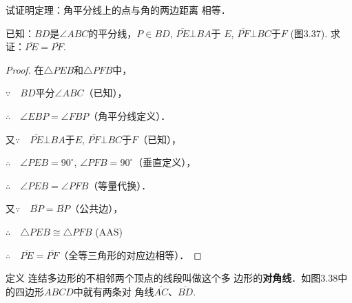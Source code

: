 \begin{example}
    试证明定理：角平分线上的点与角的两边距离
相等．

已知：$BD$是$\angle ABC$的平分线，$P\in BD$, $\overline{PE}\bot BA$于
$E$, $\overline{PF}\bot BC$于$F$ (图3.37). 
求证：$\overline{PE}=\overline{PF}$.
\end{example}

\begin{figure}[htp]
    \centering
{}
    \caption{}
\end{figure}

\begin{proof}
在$\triangle PEB$和$\triangle PFB$中，

$\because\quad BD$平分$\angle ABC$（已知），

$\therefore\quad \angle EBP=\angle FBP$（角平分线定义）．

又$\because\quad \overline{PE}\bot BA$于$E$, 
$\overline{PF}\bot BC$于$F$（已知），

$\therefore\quad \angle PEB=90^{\circ}$, $\angle PFB=90^{\circ}$（垂直定义），

$\therefore\quad \angle PEB=\angle PFB$（等量代换）．

又$\because\quad \overline{BP}=\overline{BP}$（公共边），

$\therefore\quad \triangle PEB\cong \triangle PFB$ (AAS)

$\therefore\quad \overline{PE}=\overline{PF}$（全等三角形的对应边相等）．
\end{proof}

\begin{blk}
    {定义} 连结多边形的不相邻两个顶点的线段叫做这个多
    边形的\textbf{对角线}．如图3.38中的四边形$ABCD$中就有两条对
    角线$\overline{AC}$、$\overline{BD}$.
\end{blk}

